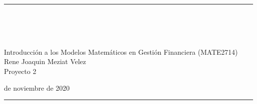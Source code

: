 \fancyhead[C]{}
\hrule \medskip
\begin{minipage}{0.295\textwidth} 
\raggedright
\footnotesize
\firstname \hfill\\ 
\firstid \hfill\\ 
\firstemail \hfill\\
\end{minipage}
\begin{minipage}{0.4\textwidth} 
\centering 
\large 
Introducción a los Modelos Matemáticos en Gestión Financiera (MATE2714)\\ 
\normalsize
Rene Joaquin Meziat Velez\\
Proyecto 2\\ 
\end{minipage}
\begin{minipage}{0.295\textwidth} 
 de noviembre de 2020\hfill\\
\end{minipage}
\medskip\hrule 
\bigskip